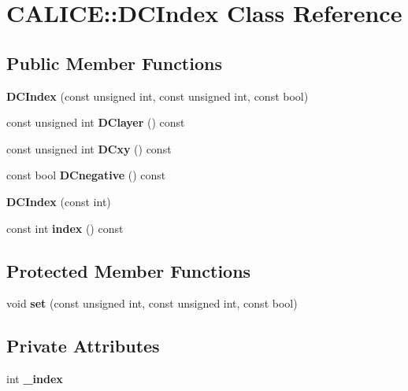 \section{C\-A\-L\-I\-C\-E\-:\-:D\-C\-Index Class Reference}
\label{classCALICE_1_1DCIndex}
\subsection*{Public Member Functions}
\begin{DoxyCompactItemize}
\item 
{\bfseries D\-C\-Index} (const unsigned int, const unsigned int, const bool)\label{classCALICE_1_1DCIndex_ad63c29da71e51daf01b7fcd1b5406062}

\item 
const unsigned int {\bfseries D\-Clayer} () const \label{classCALICE_1_1DCIndex_aea8b6f0cca2779514d318bcbd1ef6b7e}

\item 
const unsigned int {\bfseries D\-Cxy} () const \label{classCALICE_1_1DCIndex_a513d6ebf343ab177f8d72ffa17e1fc3b}

\item 
const bool {\bfseries D\-Cnegative} () const \label{classCALICE_1_1DCIndex_a6b0d5449c8e6c7d707e12e4e5ef65c81}

\item 
{\bfseries D\-C\-Index} (const int)\label{classCALICE_1_1DCIndex_accc05b44244c93a41c9213d1e007c7e3}

\item 
const int {\bfseries index} () const \label{classCALICE_1_1DCIndex_a8133a5fb0d7ee839533f9130af9a16ed}

\end{DoxyCompactItemize}
\subsection*{Protected Member Functions}
\begin{DoxyCompactItemize}
\item 
void {\bfseries set} (const unsigned int, const unsigned int, const bool)\label{classCALICE_1_1DCIndex_a20505a45223c4772c74ff7b6969ba7b4}

\end{DoxyCompactItemize}
\subsection*{Private Attributes}
\begin{DoxyCompactItemize}
\item 
int {\bfseries \-\_\-index}\label{classCALICE_1_1DCIndex_af8b745008558ed0c6d90cdaba50da47f}

\end{DoxyCompactItemize}
